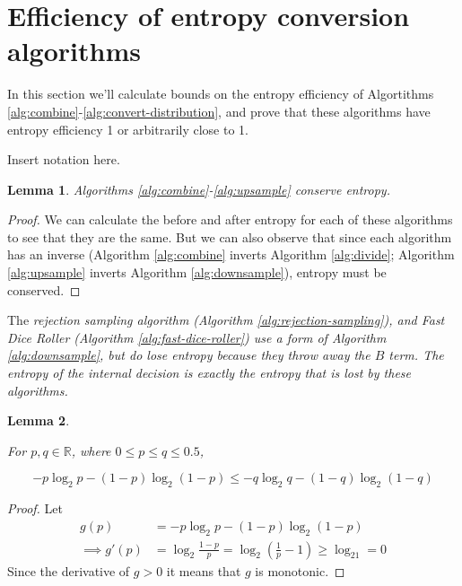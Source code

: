 \documentclass[12pt]{article}
\newtheorem{lemma}{Lemma}
\begin{document}
\section {Efficiency of entropy conversion algorithms}

In this section we'll calculate bounds on the entropy efficiency of Algortithms \ref{alg:combine}-\ref{alg:convert-distribution}, and prove that these algorithms have entropy efficiency 1 or arbitrarily close to 1.

Insert notation here.

\begin{lemma}
\label{lem:conservation}
Algorithms \ref{alg:combine}-\ref{alg:upsample} conserve entropy.
\end{lemma}

\begin{proof}
We can calculate the before and after entropy for each of these algorithms to see that they are the same. But we can also observe that since each algorithm has an inverse (Algorithm \ref{alg:combine} inverts Algorithm \ref{alg:divide}; Algorithm \ref{alg:upsample} inverts Algorithm \ref{alg:downsample}), entropy must be conserved.
\end{proof}

The \em rejection sampling \em algorithm (Algorithm \ref{alg:rejection-sampling}), and Fast Dice Roller (Algorithm \ref{alg:fast-dice-roller}) use a form of Algorithm \ref{alg:downsample}, but do lose entropy because they throw away the $B$ term. The entropy of the internal decision is exactly the entropy that is lost by these algorithms.

\begin{lemma}
    \label{lem:shannon-inequality}

For $p,q \in \mathbb{R}$, where $0 \le p\le q \le 0.5$, 

\begin{equation}
-p\log_2 p - (1-p)\log_2(1-p) \le -q\log_2 q - (1-q)\log_2(1-q)
\end{equation}
\end{lemma}

\begin{proof}
    Let
    \begin{align}
        g(p) & = -p\log_2 p - (1-p)\log_2(1-p) \\
        \implies g'(p) & = \log_2\frac{1-p}{p} = \log_2(\frac{1}{p}-1) \ge \log_21 = 0 
    \end{align}
Since the derivative of $g>0$ it means that $g$ is monotonic.
\end{proof}
\end{document}
